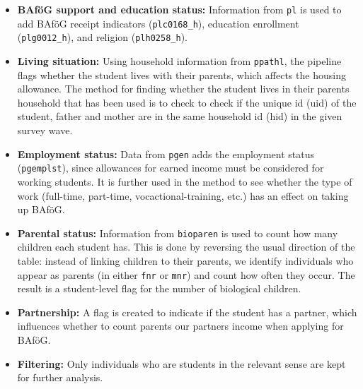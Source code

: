 \begin{itemize}
  \item \textbf{BAföG support and education status:} Information from \texttt{pl} is used to add BAföG receipt indicators (\texttt{plc0168\_h}), education enrollment (\texttt{plg0012\_h}), and religion (\texttt{plh0258\_h}).
  
  \item \textbf{Living situation:} Using household information from \texttt{ppathl}, the pipeline flags whether the student lives with their parents, which affects the housing allowance. 
    The method for finding whether the student lives in their parents household that has been used is to check to check if the unique id (uid) of the student, father and mother are in the same household id (hid) in the given survey wave.

  \item \textbf{Employment status:} Data from \texttt{pgen} adds the employment status (\texttt{pgemplst}), since allowances for earned income must be considered for working students.
    It is further used in the method to see whether the type of work (full-time, part-time, vocactional-training, etc.) has an effect on taking up BAföG.

\item \textbf{Parental status:} Information from \texttt{bioparen} is used to count how many children each student has. This is done by reversing the usual direction of the table: instead of linking children to their parents, we identify individuals who appear as parents (in either \texttt{fnr} or \texttt{mnr}) and count how often they occur. The result is a student-level flag for the number of biological children.

  \item \textbf{Partnership:} A flag is created to indicate if the student has a partner, which influences whether to count parents our partners income when applying for BAföG.

  \item \textbf{Filtering:} Only individuals who are students in the relevant sense are kept for further analysis.
\end{itemize}


